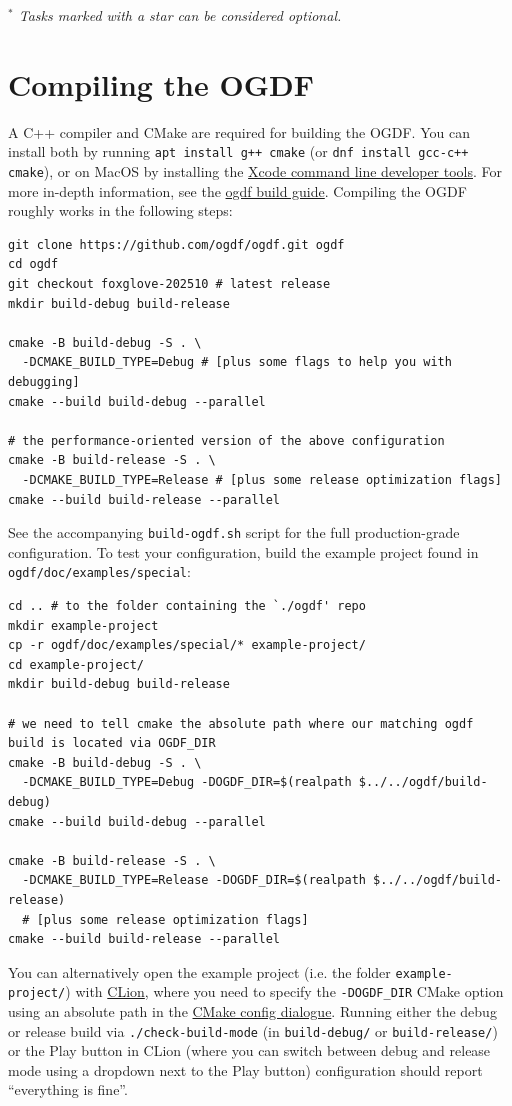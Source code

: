 \documentclass{article}
\begin{document}
\emph{$^\ast$ Tasks marked with a star can be considered optional.}


\section{Compiling the OGDF}\label{sec:compile}
A C++ compiler and CMake are required for building the OGDF.
You can install both by running \texttt{apt install g++ cmake} (or \texttt{dnf install gcc-c++ cmake}), or on MacOS by installing the \href{https://developer.apple.com/xcode/resources/}{Xcode command line developer tools}.
For more in-depth information, see the \href{https://ogdf.github.io/doc/ogdf/md_doc_2build.html#build}{ogdf build guide}.
Compiling the OGDF roughly works in the following steps:
\begin{lstlisting}
git clone https://github.com/ogdf/ogdf.git ogdf
cd ogdf
git checkout foxglove-202510 # latest release
mkdir build-debug build-release

cmake -B build-debug -S . \
  -DCMAKE_BUILD_TYPE=Debug # [plus some flags to help you with debugging]
cmake --build build-debug --parallel

# the performance-oriented version of the above configuration
cmake -B build-release -S . \
  -DCMAKE_BUILD_TYPE=Release # [plus some release optimization flags]
cmake --build build-release --parallel
\end{lstlisting}
See the accompanying \texttt{build-ogdf.sh} script for the full production-grade configuration.
To test your configuration, build the example project found in \texttt{ogdf/doc/examples/special}:
\begin{lstlisting}
cd .. # to the folder containing the `./ogdf' repo
mkdir example-project
cp -r ogdf/doc/examples/special/* example-project/
cd example-project/
mkdir build-debug build-release

# we need to tell cmake the absolute path where our matching ogdf build is located via OGDF_DIR
cmake -B build-debug -S . \
  -DCMAKE_BUILD_TYPE=Debug -DOGDF_DIR=$(realpath $../../ogdf/build-debug)
cmake --build build-debug --parallel

cmake -B build-release -S . \
  -DCMAKE_BUILD_TYPE=Release -DOGDF_DIR=$(realpath $../../ogdf/build-release)
  # [plus some release optimization flags]
cmake --build build-release --parallel
\end{lstlisting}
You can alternatively open the example project (i.e. the folder \texttt{example-project/}) with \href{https://www.jetbrains.com/help/clion/clion-quick-start-guide.html}{CLion}, where you need to specify the \texttt{-DOGDF\_DIR} CMake option using an absolute path in the \href{https://www.jetbrains.com/help/clion/cmake-profile.html#cmake-options}{CMake config dialogue}.
Running either the debug or release build via \texttt{./check-build-mode} (in \texttt{build-debug/} or \texttt{build-release/}) or the Play button in CLion (where you can switch between debug and release mode using a dropdown next to the Play button) configuration should report ``everything is fine''.
\end{document}
